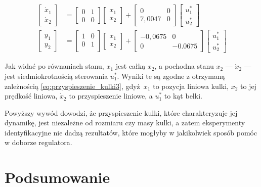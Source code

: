 \begin{align*}
    \begin{bmatrix}
        \dot{x}_1 \\ \dot{x}_2
    \end{bmatrix}
    &= \begin{bmatrix}
        0 & 1 \\
        0 & 0
    \end{bmatrix}
    \begin{bmatrix}
        x_1 \\ x_2
    \end{bmatrix}
    +
    \begin{bmatrix}
        0 & 0 \\ 7,0047 & 0
    \end{bmatrix}
    \begin{bmatrix}
        u_1^* \\ u_2^*
    \end{bmatrix}\\
    \begin{bmatrix}
        y_1 \\ y_2
    \end{bmatrix}
    &= \begin{bmatrix}
        1 & 0 \\
        0 & 1 \\
    \end{bmatrix}
    \begin{bmatrix}
        x_1 \\ x_2
    \end{bmatrix}
    + \begin{bmatrix}
        -0,0675 & 0 \\
        0 & -0.0675
    \end{bmatrix}
    \begin{bmatrix}
        u_1^* \\ u_2^*
    \end{bmatrix}
\end{align*}

Jak widać po równaniach stanu, $x_1$ jest całką $x_2$, a pochodna stanu $x_2$ --- $\dot{x}_2$ --- jest siedmiokrotnością sterowania $u_1^*$. Wyniki te są zgodne z otrzymaną zależnością \eqref{eq:przyspieszenie_kulki3}, gdyż $x_1$ to pozycja liniowa kulki, $x_2$ to jej prędkość liniowa, $\dot{x}_2$ to przyspieszenie liniowe, a $u_1^*$ to kąt belki.

Powyższy wywód dowodzi, że przyspieszenie kulki, które charakteryzuje jej dynamikę, jest niezależne od rozmiaru czy masy kulki, a zatem eksperymenty identyfikacyjne nie dadzą rezultatów, które mogłyby w jakikolwiek sposób pomóc w doborze regulatora.


\section{Podsumowanie}

